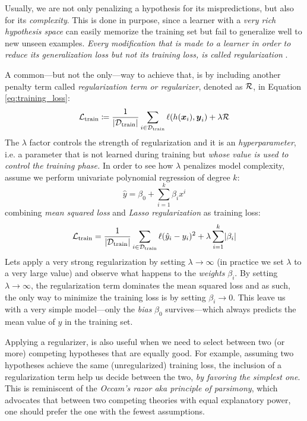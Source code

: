 Usually, we are not only penalizing a hypothesis for its mispredictions, but
also for its \emph{complexity}. This is done in purpose, since a learner with a
\emph{very rich hypothesis space} can easily memorize the training set but fail
to generalize well to new unseen examples. \emph{Every modification that is made
to a learner in order to reduce its generalization loss but not its training
loss, is called regularization} \parencite{deeplearning}.

A common---but not the only---way to achieve that, is by including another
penalty term called \emph{regularization term or
regularizer}, denoted as $\mathcal{R}$, in Equation
\ref{eq:training_loss}:
\begin{equation}
	\label{eq:regularization}
	\mathcal{L}_\text{train} \coloneqq \frac{1}{\lvert \mathcal{D}_\text{train} \rvert} \sum_{i \in \mathcal{D}_\text{train}}
	\ell(h(\boldsymbol{x}_i), \boldsymbol{y}_i)
	+
	\lambda \mathcal{R}
\end{equation}
The $\lambda$ factor controls the strength of regularization and it is an
\emph{hyperparameter}, i.e. a parameter that is not
learned during training but \emph{whose value is used to control the training
phase.} In order to see how $\lambda$ penalizes model complexity, assume we
perform univariate polynomial regression
of degree $k$:
\begin{equation}
	\hat{y} = \beta_0 + \sum_{i=1}^k \beta_i x^i
\end{equation}
combining \emph{mean squared loss} and
\emph{Lasso regularization} as training loss:
\begin{equation}
	\label{eq:lasso}
	\mathcal{L}_\text{train} = \frac{1}{\lvert \mathcal{D}_\text{train} \rvert} \sum_{i \in \mathcal{D}_\text{train}}
	\ell(\hat{y}_i - y_i)^2
	+
	\lambda \sum_{i=1}^k \lvert \beta_i \rvert
\end{equation}
Lets apply a very strong regularization by setting $\lambda \to \infty$ (in
practice we set $\lambda$ to a very large value) and observe what happens to the
\emph{weights} $\beta_i$. By setting $\lambda \to
\infty$, the regularization term dominates the mean squared loss and as such,
the only way to minimize the training loss is by setting $\beta_i \to 0$. This
leave us with a very simple model---only the \emph{bias}
$\beta_0$ survives---which always predicts the mean value of $y$ in the training
set.

Applying a regularizer, is also useful when we need to select between two (or
more) competing hypotheses that are equally good. For example, assuming two
hypotheses achieve the same (unregularized) training loss, the inclusion of a
regularization term help us decide between the two, \emph{by favoring the
simplest one}. This is reminiscent of the \emph{Occam's razor aka principle of
parsimony}, which advocates that between two competing theories with equal
explanatory power, one should prefer the one with the fewest assumptions.

